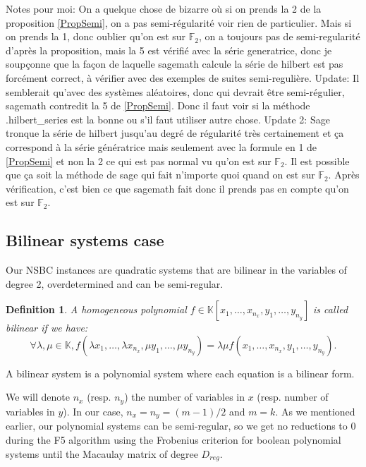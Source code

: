 \documentclass[english]{article}
\newtheorem{definition}{Definition}[section]
\begin{document}
		Notes pour moi: On a quelque chose de bizarre où si on prends la 2 de la proposition \ref{PropSemi}, on a pas semi-régularité voir rien de particulier. Mais si on prends la 1, donc oublier qu'on est sur $\mathbb{F}_2$, on a toujours pas de semi-regularité d'après la proposition, mais la 5 est vérifié avec la série generatrice, donc je soupçonne que la façon de laquelle sagemath calcule la série de hilbert est pas forcément correct, à vérifier avec des exemples de suites semi-regulière. Update: Il semblerait qu'avec des systèmes aléatoires, donc qui devrait être semi-régulier, sagemath contredit la 5 de \ref{PropSemi}. Donc il faut voir si la méthode .hilbert\_series est la bonne ou s'il faut utiliser autre chose. Update 2: Sage tronque la série de hilbert jusqu'au degré de régularité très certainement et ça correspond à la série génératrice mais seulement avec la formule en 1 de \ref{PropSemi} et non la 2 ce qui est pas normal vu qu'on est sur $\mathbb{F}_2$. Il est possible que ça soit la méthode de sage qui fait n'importe quoi quand on est sur $\mathbb{F}_2$. Après vérification, c'est bien ce que sagemath fait donc il prends pas en compte qu'on est sur $\mathbb{F}_2$.

		
		\subsection{Bilinear systems case}
		Our NSBC instances are quadratic systems that are bilinear in the variables of degree 2, overdetermined and can be semi-regular.
		
		\begin{definition}
			A homogeneous polynomial $f \in \mathbb{K}[x_1,\dots,x_{n_x},y_1,\dots,y_{n_y}]$ is called bilinear if we have:
			$$
				\forall \lambda, \mu \in \mathbb{K}, f(\lambda x_1,\dots,\lambda x_{n_x}, \mu y_1,\dots, \mu y_{n_y}) = \lambda \mu f(x_1,\dots,x_{n_x},y_1,\dots,y_{n_y}).
			$$
		\end{definition}
		
		A bilinear system is a polynomial system where each equation is a bilinear form.
		
		We will denote $n_x$ (resp. $n_y$) the number of variables in $x$ (resp. number of variables in $y$). In our case, $n_x = n_y = (m-1)/2$ and $m = k$. As we mentioned earlier, our polynomial systems can be semi-regular, so we get no reductions to 0 during the F5 algorithm using the Frobenius criterion for boolean polynomial systems until the Macaulay matrix of degree $D_{reg}$.
		
\end{document}
